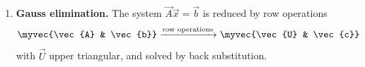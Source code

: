 \begin{enumerate}[label=\thesubsection.\arabic*, ref=\thesubsection.\theenumi,itemsep=0pt]
\item \textbf{Gauss elimination.} The system $\vec{A}\vec{x} = \vec{b}$ is reduced by row operations
\begin{align}
\myvec{\vec{A} & \vec{b}} \xrightarrow{\text{row operations}} \myvec{\vec{U} & \vec{c}}
\label{eq:cb12-gauss}
\end{align}
with $\vec{U}$ upper triangular, and solved by back substitution.

\end{enumerate}
